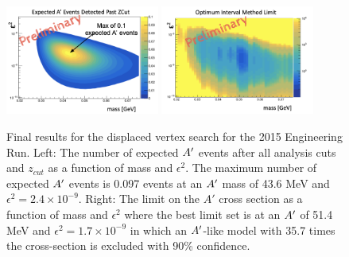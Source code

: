 \begin{figure}
    \centering
    \includegraphics[width=0.45\textwidth]{figs/selection/detectable_2015.png}
    \includegraphics[width=0.45\textwidth]{figs/selection/oim_2015.png}
    \caption{Final results for the displaced vertex search for the 2015 Engineering Run. Left: The number of expected $A^\prime$ events after all analysis cuts and $z_{cut}$ as a function of mass and $\epsilon^2$. The maximum number of expected $A^\prime$ events is 0.097 events at an $A^\prime$ mass of 43.6 MeV and $\epsilon^2 = 2.4 \times 10^{-9}$. Right: The limit on the $A'$ cross section as a function of mass and $\epsilon^2$ where the best limit set is at an $A^\prime$ of 51.4 MeV and $\epsilon^2=1.7 \times 10^{-9}$ in which an $A^\prime$-like model with 35.7 times the cross-section is excluded with 90\% confidence.}
    \label{fig:2015results}
\end{figure}

